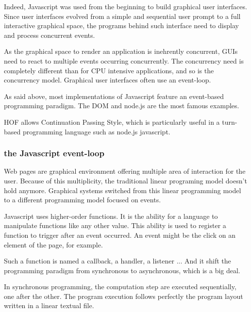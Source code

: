 Indeed, Javascript was used from the beginning to build graphical user interfaces.
Since user interfaces evolved from a simple and sequential user prompt to a full interactive graphical space, the programs behind such interface need to display and process concurrent events.




As the graphical space to render an application is inehrently concurrent, GUIs need to react to multiple events occurring concurrently.
The concurrency need is completely different than for CPU intensive applications, and so is the concurrency model.
Graphical user interfaces often use an event-loop.




As said above, most implementations of Javascript feature an event-based programming paradigm.
The DOM and node.js are the most famous examples.


HOF allows Continuation Passing Style, which is particularly useful in a turn-based programming language such as node.js javascript.



\subsubsection{the Javascript event-loop}

Web pages are graphical environment offering multiple area of interaction for the user.
Because of this multiplicity, the traditional linear programing model doesn't hold anymore.
Graphical systems switched from this linear programming model to a different programming model focused on events.

Javascript uses higher-order functions.
It is the ability for a language to manipulate functions like any other value.
This ability is used to register a function to trigger after an event occurred.
An event might be the click on an element of the page, for example.

Such a function is named a callback, a handler, a listener ...
And it shift the programming paradigm from synchronous to asynchronous, which is a big deal.

In synchronous programming, the computation step are executed sequentially, one after the other.
The program execution follows perfectly the program layout written in a linear textual file.

